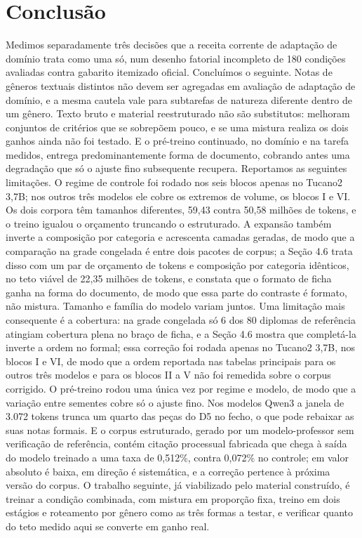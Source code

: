 \documentclass{IOS-Book-Article}
\begin{document}
\section{Conclusão}
Medimos separadamente três decisões que a receita corrente de adaptação de domínio trata como uma só, num desenho fatorial incompleto de 180 condições avaliadas contra gabarito itemizado oficial. Concluímos o seguinte. Notas de gêneros textuais distintos não devem ser agregadas em avaliação de adaptação de domínio, e a mesma cautela vale para subtarefas de natureza diferente dentro de um gênero. Texto bruto e material reestruturado não são substitutos: melhoram conjuntos de critérios que se sobrepõem pouco, e se uma mistura realiza os dois ganhos ainda não foi testado. E o pré-treino continuado, no domínio e na tarefa medidos, entrega predominantemente forma de documento, cobrando antes uma degradação que só o ajuste fino subsequente recupera.
Reportamos as seguintes limitações. O regime de controle foi rodado nos seis blocos apenas no Tucano2 3,7B; nos outros três modelos ele cobre os extremos de volume, os blocos I e VI. Os dois corpora têm tamanhos diferentes, 59,43 contra 50,58 milhões de tokens, e o treino igualou o orçamento truncando o estruturado. A expansão também inverte a composição por categoria e acrescenta camadas geradas, de modo que a comparação na grade congelada é entre dois pacotes de corpus; a Seção 4.6 trata disso com um par de orçamento de tokens e composição por categoria idênticos, no teto viável de 22,35 milhões de tokens, e constata que o formato de ficha ganha na forma do documento, de modo que essa parte do contraste é formato, não mistura. Tamanho e família do modelo variam juntos. Uma limitação mais consequente é a cobertura: na grade congelada só 6 dos 80 diplomas de referência atingiam cobertura plena no braço de ficha, e a Seção 4.6 mostra que completá-la inverte a ordem no formal; essa correção foi rodada apenas no Tucano2 3,7B, nos blocos I e VI, de modo que a ordem reportada nas tabelas principais para os outros três modelos e para os blocos II a V não foi remedida sobre o corpus corrigido. O pré-treino rodou uma única vez por regime e modelo, de modo que a variação entre sementes cobre só o ajuste fino. Nos modelos Qwen3 a janela de 3.072 tokens trunca um quarto das peças do D5 no fecho, o que pode rebaixar as suas notas formais. E o corpus estruturado, gerado por um modelo-professor sem verificação de referência, contém citação processual fabricada que chega à saída do modelo treinado a uma taxa de 0,512\%, contra 0,072\% no controle; em valor absoluto é baixa, em direção é sistemática, e a correção pertence à próxima versão do corpus. O trabalho seguinte, já viabilizado pelo material construído, é treinar a condição combinada, com mistura em proporção fixa, treino em dois estágios e roteamento por gênero como as três formas a testar, e verificar quanto do teto medido aqui se converte em ganho real.
\appendix
\end{document}
